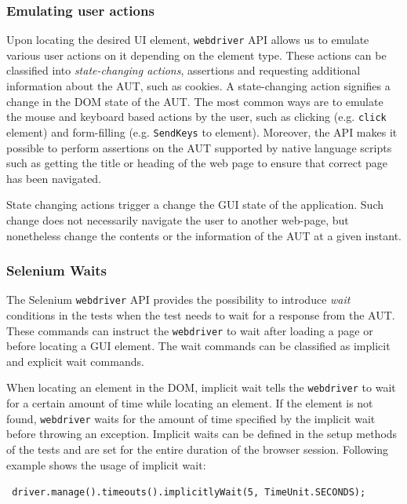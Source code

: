 \subsubsection{Emulating user actions}
\label{sssec:emulatingActions}
Upon locating the desired UI element, \texttt{webdriver} API allows us to emulate various user actions on it depending on the element type. These actions can be classified into \textit{state-changing actions}, assertions and requesting additional information about the AUT, such as cookies. A state-changing action signifies a change in the DOM state of the AUT. The most common ways are to emulate the mouse and keyboard based actions by the user, such as clicking (e.g. \texttt{click} element) and form-filling (e.g. \texttt{SendKeys} to element). Moreover, the API makes it possible to perform assertions on the AUT supported by native language scripts such as getting the title or heading of the web page to ensure that correct page has been navigated. 

State changing actions trigger a change the GUI state of the application. Such change does not necessarily navigate the user to another web-page, but nonetheless change the contents or the information of the AUT at a given instant.

\subsubsection{Selenium Waits}
\label{sssec:seleniumwaits}
The Selenium \texttt{webdriver} API provides the possibility to introduce \textit{wait} conditions in the tests when the test needs to wait for a response from the AUT. These commands can instruct the \texttt{webdriver} to wait after loading a page or before locating a GUI element. The wait commands can be classified as implicit and explicit wait commands. 

When locating an element in the DOM, implicit wait tells the \texttt{webdriver} to wait for a certain amount of time while locating an element. If the element is not found, \texttt{webdriver} waits for the amount of time specified by the implicit wait before throwing an exception. Implicit waits can be defined in the setup methods of the tests and are set for the entire duration of the browser session. Following example shows the usage of implicit wait:
\begin{footnotesize}
\texttt{ driver.manage().timeouts().implicitlyWait(5, TimeUnit.SECONDS); 
}
\end{footnotesize}

